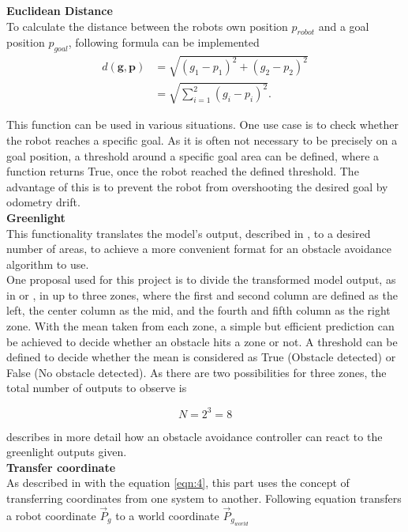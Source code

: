 \textbf{Euclidean Distance}\\
To calculate the distance between the robots own position $p_{robot}$ and a goal position $p_{goal}$, following formula can be implemented
\begin{equation}
\label{eqn:12}
{\displaystyle {\begin{aligned}d(\mathbf {g} ,\mathbf {p} )&={\sqrt {(g_{1}-p_{1})^{2}+(g_{2}-p_{2})^{2}}}\\[8pt]&={\sqrt {\sum _{i=1}^{2}(g_{i}-p_{i})^{2}}}.\end{aligned}}}
\end{equation}

This function can be used in various situations. One use case is to check whether the robot reaches a specific goal. As it is often not necessary to be precisely on a goal position, a threshold around a specific goal area can be defined, where a function returns True, once the robot reached the defined threshold. The advantage of this is to prevent the robot from overshooting the desired goal by odometry drift.\\

\textbf{Greenlight}\\
This functionality translates the model's output, described in , to a desired number of areas, to achieve a more convenient format for an obstacle avoidance algorithm to use.\\  

One proposal used for this project is to divide the transformed model output, as in  or , in up to three zones, where the first and second column are defined as the left, the center column as the mid, and the fourth and fifth column as the right zone. With the mean taken from each zone, a simple but efficient prediction can be achieved to decide whether an obstacle hits a zone or not. A threshold can be defined to decide whether the mean is considered as True (Obstacle detected) or False (No obstacle detected). As there are two possibilities for three zones, the total number of outputs to observe is

\begin{equation}
\label{eqn:13}
N = 2^3 = 8
\end{equation}

 describes in more detail how an obstacle avoidance controller can react to the greenlight outputs given.\\

\textbf{Transfer coordinate}\\
As described in  with the equation \ref{eqn:4}, this part uses the concept of transferring coordinates from one system to another. Following equation transfers a robot coordinate $\vec{P}_{g}$ to a world coordinate $\vec{P}_{g_{world}}$


